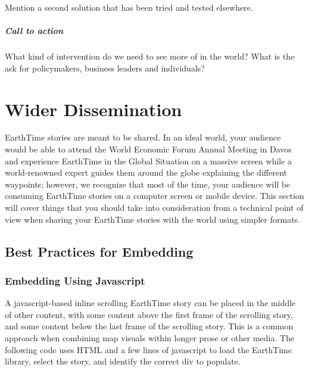 \documentclass[
]{book}
\renewenvironment{quote}{\begin{VF}}{\end{VF}}
\begin{document}
\begin{quote}
Mention a second solution that has been tried and tested elsewhere.
\end{quote}

\hypertarget{call-to-action}{%
\paragraph*{Call to action}\label{call-to-action}}

\begin{quote}
What kind of intervention do we need to see more of in the world? What is the ask for policymakers, business leaders and individuals?
\end{quote}

\hypertarget{wider-dissemination}{%
\chapter{Wider Dissemination}\label{wider-dissemination}}

EarthTime stories are meant to be shared. In an ideal world, your audience would be able to attend the World Economic Forum Annual Meeting in Davos and experience EarthTime in the Global Situation on a massive screen while a world-renowned expert guides them around the globe explaining the different waypoints; however, we recognize that most of the time, your audience will be consuming EarthTime stories on a computer screen or mobile device. This section will cover things that you should take into consideration from a technical point of view when sharing your EarthTime stories with the world using simpler formats.

\hypertarget{best-practices-for-embedding}{%
\section{Best Practices for Embedding}\label{best-practices-for-embedding}}

\hypertarget{embedding-using-javascript}{%
\subsection*{Embedding Using Javascript}\label{embedding-using-javascript}}


A javascript-based inline scrolling EarthTime story can be placed in the middle of other content, with some content above the first frame of the scrolling story, and some content below the last frame of the scrolling story. This is a common approach when combining map visuals within longer prose or other media. The following code uses HTML and a few lines of javascript to load the EarthTime library, select the story, and identify the correct div to populate.
\end{document}
